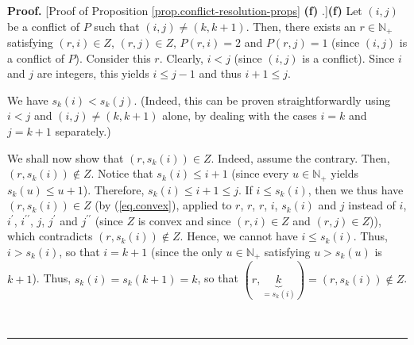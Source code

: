\documentclass[numbers=enddot,12pt,final,onecolumn,notitlepage]{scrartcl}%
\theoremstyle{definition}
\newenvironment{proof}[1][Proof]{\noindent\textbf{#1.} }{\ \rule{0.5em}{0.5em}}
\newenvironment{noncompile}{}{}
\begin{document}
\begin{noncompile}
\begin{proof}
[Proof of Proposition \ref{prop.conflict-resolution-props} \textbf{(f)}%
.]\textbf{(f)} Let $\left(  i,j\right)  $ be a conflict of $P$ such that
$\left(  i,j\right)  \neq\left(  k,k+1\right)  $. Then, there exists an
$r\in\mathbb{N}_{+}$ satisfying $\left(  r,i\right)  \in Z$, $\left(
r,j\right)  \in Z$, $P\left(  r,i\right)  =2$ and $P\left(  r,j\right)  =1$
(since $\left(  i,j\right)  $ is a conflict of $P$). Consider this $r$.
Clearly, $i<j$ (since $\left(  i,j\right)  $ is a conflict). Since $i$ and $j$
are integers, this yields $i\leq j-1$ and thus $i+1\leq j$.

We have $s_{k}\left(  i\right)  <s_{k}\left(  j\right)  $. (Indeed, this can
be proven straightforwardly using $i<j$ and $\left(  i,j\right)  \neq\left(
k,k+1\right)  $ alone, by dealing with the cases $i=k$ and $j=k+1$ separately.)

We shall now show that $\left(  r,s_{k}\left(  i\right)  \right)  \in Z$.
Indeed, assume the contrary. Then, $\left(  r,s_{k}\left(  i\right)  \right)
\notin Z$. Notice that $s_{k}\left(  i\right)  \leq i+1$ (since every
$u\in\mathbb{N}_{+}$ yields $s_{k}\left(  u\right)  \leq u+1$). Therefore,
$s_{k}\left(  i\right)  \leq i+1\leq j$. If $i\leq s_{k}\left(  i\right)  $,
then we thus have $\left(  r,s_{k}\left(  i\right)  \right)  \in Z$ (by
(\ref{eq.convex}), applied to $r$, $r$, $r$, $i$, $s_{k}\left(  i\right)  $
and $j$ instead of $i$, $i^{\prime}$, $i^{\prime\prime}$, $j$, $j^{\prime}$
and $j^{\prime\prime}$ (since $Z$ is convex and since $\left(  r,i\right)  \in
Z$ and $\left(  r,j\right)  \in Z$)), which contradicts $\left(
r,s_{k}\left(  i\right)  \right)  \notin Z$. Hence, we cannot have $i\leq
s_{k}\left(  i\right)  $. Thus, $i>s_{k}\left(  i\right)  $, so that $i=k+1$
(since the only $u\in\mathbb{N}_{+}$ satisfying $u>s_{k}\left(  u\right)  $ is
$k+1$). Thus, $s_{k}\left(  i\right)  =s_{k}\left(  k+1\right)  =k$, so that
$\left(  r,\underbrace{k}_{=s_{k}\left(  i\right)  }\right)  =\left(
r,s_{k}\left(  i\right)  \right)  \notin Z$.


\end{proof}
\end{noncompile}
\end{document}
